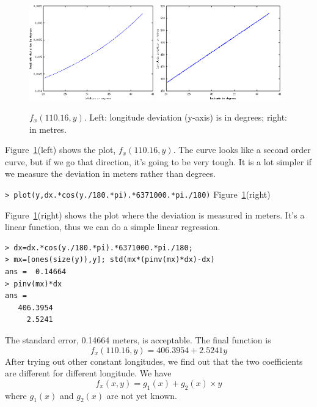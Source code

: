 \documentclass[a4paper]{article}
\begin{document}
\begin{figure}[htb]
\begin{center}
\includegraphics[width=0.48\textwidth]{fxy-degree.png}
\includegraphics[width=0.48\textwidth]{fxy-metre.png}
\end{center}
\caption{$f_x(110.16,y)$. Left: longitude deviation (y-axis) is in degrees;
right: in metres.}
\label{fig:fxy-degree}
\end{figure}

Figure~\ref{fig:fxy-degree}(left) shows the plot, $f_x(110.16,y)$. The curve
looks like a second order curve, but if we go that direction, it's going to be
very tough.
It is a lot simpler if we measure the deviation in meters rather
than degrees.

\noindent
\verb|> plot(y,dx.*cos(y./180.*pi).*6371000.*pi./180)| \hfill
Figure~\ref{fig:fxy-degree}(right)

Figure~\ref{fig:fxy-degree}(right) shows the plot where the deviation is
measured in meters.
It's a linear function, thus we can do a simple linear regression.
\begin{verbatim}
> dx=dx.*cos(y./180.*pi).*6371000.*pi./180;
> mx=[ones(size(y)),y]; std(mx*(pinv(mx)*dx)-dx)
ans =  0.14664
> pinv(mx)*dx
ans =
   406.3954
     2.5241
\end{verbatim}
The standard error, 0.14664 meters, is acceptable.
The final function is
\begin{equation}
f_x(110.16,y)=406.3954+2.5241y
\end{equation}
After trying out other constant longitudes,
we find out that the two coefficients are different for different longitude.
We have
\begin{equation}
f_x(x,y)=g_1(x)+g_2(x)\times y
\end{equation}
where $g_1(x)$ and $g_2(x)$ are not yet known.
\end{document}
